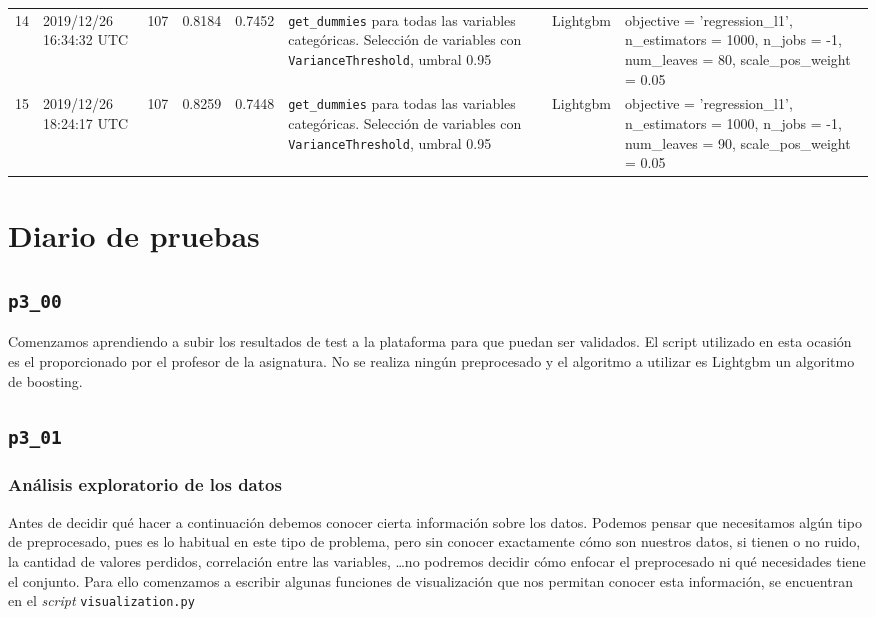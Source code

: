 \documentclass[a4paper, 20pt]{article}
\begin{document}
\begin{longtable}{lL{2cm}lllL{3cm}L{2.5cm}L{3.5cm}}
14 & 2019/12/26 16:34:32 UTC & 107 & 0.8184 & 0.7452 & \texttt{get\_dummies} para todas las variables categóricas. Selección de variables con \texttt{VarianceThreshold}, umbral 0.95 & Lightgbm & {\ttfamily objective = 'regression\_l1', n\_estimators = 1000, n\_jobs = -1, num\_leaves = 80, scale\_pos\_weight = 0.05}\\

15 & 2019/12/26 18:24:17 UTC & 107 & 0.8259 & 0.7448 &\texttt{get\_dummies} para todas las variables categóricas. Selección de variables con \texttt{VarianceThreshold}, umbral 0.95 & Lightgbm & {\ttfamily objective = 'regression\_l1', n\_estimators = 1000, n\_jobs = -1, num\_leaves = 90, scale\_pos\_weight = 0.05}\\
\bottomrule
\end{longtable}
\newpage

\section{Diario de pruebas}
\subsection{\texttt{p3\_00}}
Comenzamos aprendiendo a subir los resultados de test a la plataforma para que puedan ser validados. El script utilizado en esta ocasión es el proporcionado por el profesor de la asignatura. No se realiza ningún preprocesado y el algoritmo a utilizar es Lightgbm un algoritmo de boosting.

\subsection{\texttt{p3\_01}}
\subsubsection{Análisis exploratorio de los datos}

Antes de decidir qué hacer a continuación debemos conocer cierta información sobre los datos. Podemos pensar que necesitamos algún tipo de preprocesado, pues es lo habitual en este tipo de problema, pero sin conocer exactamente cómo son nuestros datos, si tienen o no ruido, la cantidad de valores perdidos, correlación entre las variables, \dots no podremos decidir cómo enfocar el preprocesado ni qué necesidades tiene el conjunto. Para ello comenzamos a escribir algunas funciones de visualización que nos permitan conocer esta información, se encuentran en el \textit{script} \texttt{visualization.py}
\end{document}
